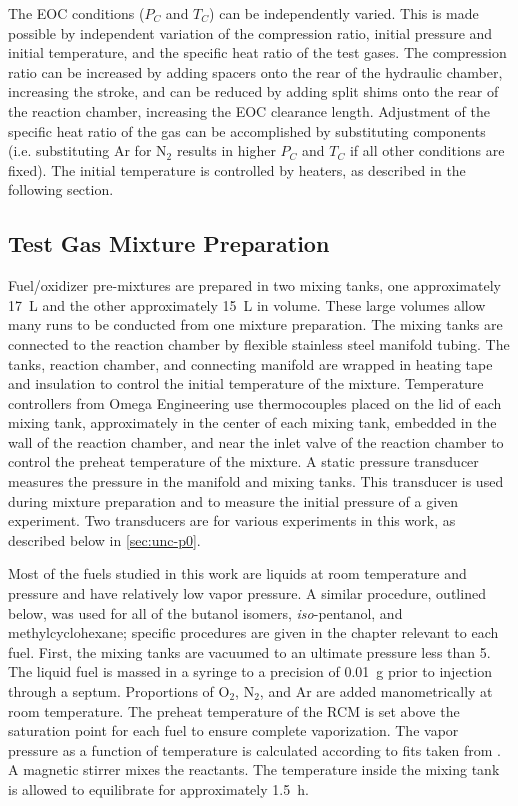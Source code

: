 \documentclass[../main.tex]{subfiles}
\begin{document}
The EOC conditions ($P_C$ and $T_C$) can be independently varied. This
is made possible by independent variation of the compression ratio,
initial pressure and initial temperature, and the specific heat ratio
of the test gases. The compression ratio can be
increased by adding spacers onto the rear of the hydraulic chamber,
increasing the stroke, and can be reduced by adding split shims onto
the rear of the reaction chamber, increasing the EOC clearance length.
Adjustment of the specific heat ratio of the gas can be accomplished
by substituting components (i.e. substituting Ar for N$_2$ results in
higher $P_C$ and $T_C$ if all other conditions are fixed). The initial
temperature is controlled by heaters, as described in the following
section.

\subsection{Test Gas Mixture Preparation}

Fuel/oxidizer pre-mixtures are prepared in two mixing tanks, one approximately
\SI{17}{\liter} and the other approximately \SI{15}{\liter} in volume. These large volumes allow many
runs to be conducted from one mixture preparation. The mixing tanks are connected
to the reaction chamber by flexible stainless steel manifold tubing. The tanks, reaction chamber,
and connecting manifold are wrapped in heating tape and insulation to control the initial
temperature of the mixture. Temperature controllers from Omega Engineering use thermocouples
placed on the lid of each mixing tank, approximately in the center of each mixing tank, embedded in
the wall of the reaction chamber, and near the inlet valve of the reaction chamber to control the
preheat temperature of the mixture. A static pressure transducer
measures the pressure in the manifold and mixing tanks. This transducer is used
during mixture preparation and to measure the initial pressure of a given experiment.
Two transducers are for various experiments in this work, as described below
in \cref{sec:unc-p0}.

Most of the fuels studied in this work are liquids at room temperature and
pressure and have relatively low vapor pressure. A similar procedure, outlined
below, was used for all of the butanol isomers, \textit{iso}-pentanol, and
methylcyclohexane; specific procedures are given in the chapter relevant to
each fuel. First, the mixing tanks are vacuumed to an ultimate pressure
less than \SI{5}{\torr}. The liquid fuel is massed in a syringe to a precision of
\SI{0.01}{\gram} prior to injection through a septum. Proportions of O$_2$, N$_2$, and
Ar are added manometrically at room temperature. The preheat temperature of
the RCM is set above the saturation point for each fuel to ensure complete
vaporization. The vapor pressure as a function of temperature is calculated
according to fits taken from \textcite{Yaws1999}. A magnetic stirrer mixes
the reactants. The temperature inside the mixing tank is allowed to
equilibrate for approximately \SI{1.5}{\hour}.
\end{document}

